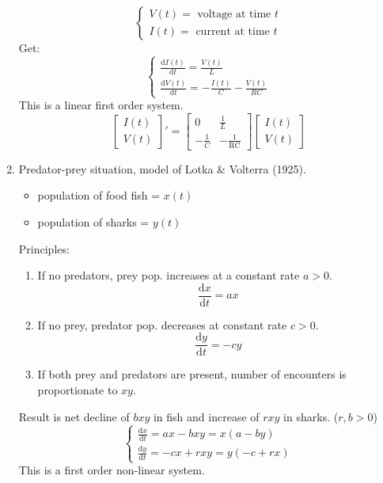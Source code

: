 \documentclass{article}
\newcommand{\mathd}{\mathrm{d}}
\newcommand{\tmop}[1]{\ensuremath{\operatorname{#1}}}
\begin{document}
\begin{enumerate}
  \begin{center}
  \end{center}
  \[ \left\{\begin{array}{l}
       V (t) = \text{ voltage at time $t$}\\
       I (t) = \text{ current at time } t
     \end{array}\right. \]
  Get:
  \[ \left\{\begin{array}{l}
       \frac{\mathd I (t)}{\mathd t} = \frac{V (t)}{L}\\
       \frac{\mathd V (t)}{\mathd t} = - \frac{I (t)}{C} - \frac{V (t)}{RC}
     \end{array}\right. \]
  This is a linear first order system.
  \[ \left[\begin{array}{c}
       I (t)\\
       V (t)
     \end{array}\right]' = \left[\begin{array}{cc}
       0 & \frac{1}{L}\\
       - \frac{1}{C} & - \frac{1}{\tmop{RC}}
     \end{array}\right]  \left[\begin{array}{c}
       I (t)\\
       V (t)
     \end{array}\right] \]
  \item Predator-prey situation, model of Lotka \& Volterra (1925).
  \begin{itemize}
    \item population of food fish = $x (t)$
    
    \item population of sharks = $y (t)$
  \end{itemize}
  Principles:
  \begin{enumerate}
    \item If no predators, prey pop. increases at a constant rate $a > 0$.
    \[ \frac{\mathd x}{\mathd t} = ax \]
    \item If no prey, predator pop. decreases at constant rate $c > 0$.
    \[ \frac{\mathd y}{\mathd t} = - cy \]
    \item If both prey and predators are present, number of encounters is
    proportionate to $xy$.
  \end{enumerate}
  Result is net decline of $bxy$ in fish and increase of $rxy$ in sharks. ($r,
  b > 0$)
  \[ \left\{\begin{array}{l}
       \frac{\mathd x}{\mathd t} = ax - bxy = x (a - by)\\
       \frac{\mathd y}{\mathd t} = - cx + rxy = y (- c + rx)
     \end{array}\right. \]
  This is a first order non-linear system.
  

\end{enumerate}
\end{document}
